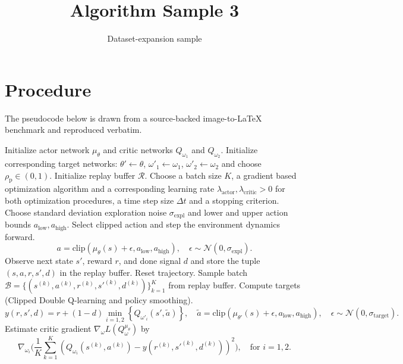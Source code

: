 \documentclass[11pt]{article}
\title{Algorithm Sample 3}
\author{Dataset-expansion sample}
\date{}
\begin{document}
\maketitle
\section{Procedure}
The pseudocode below is drawn from a source-backed image-to-LaTeX benchmark and reproduced verbatim.

\begin{algorithmic}
[1]
\State Initialize actor network $\mu_\theta$ and critic networks $Q_{\omega_1}$ and $Q_{\omega_2}$.
\State Initialize corresponding target networks: $\theta' \leftarrow \theta$, ${\omega'}_1 \leftarrow \omega_1$, ${\omega'}_2 \leftarrow \omega_2$ and choose $\rho_\text{p} \in (0, 1)$.
\State Initialize replay buffer $\mathcal{R}$.
\State Choose a batch size $K$, a gradient based optimization algorithm and a corresponding learning rate $\lambda_\text{actor}, \lambda_\text{critic} > 0$ for both optimization procedures, a time step size $\Delta t$ and a stopping criterion.
\State Choose standard deviation exploration noise $\sigma_\text{expl}$ and lower and upper action bounds $a_\text{low}, a_\text{high}$.
\Repeat
\State Select clipped action and step the environment dynamics forward.
\begin{equation*}
a= \text{clip}(\mu_\theta(s) + \epsilon, a_\text{low}, a_\text{high}), \quad \epsilon \sim \mathcal{N}(0, \sigma_\text{expl}).
\end{equation*}
\State Observe next state $s'$, reward $r$, and done signal $d$ and store the tuple $(s, a, r, s', d)$ in the replay buffer.
\State Reset trajectory.
\EndIf
{}
\State Sample batch $\mathcal{B} = \{(s^{(k)}, a^{(k)}, r^{(k)}, {s'}^{(k)}, d^{(k)})\}_{k=1}^K$ from replay buffer.
\State Compute targets (Clipped Double Q-learning and policy smoothing).
\begin{equation*}
y(r, s', d) = r + (1-d) \min\limits_{i=1, 2} \left\{ Q_{{\omega'}_i}(s', \tilde{a}) \right\}, \quad \tilde{a}= \text{clip}(\mu_{\theta'}(s) + \epsilon, a_\text{low}, a_\text{high}), \quad \epsilon \sim \mathcal{N}(0, \sigma_\text{target}).
\end{equation*}
\State Estimate critic gradient $\nabla_\omega L(Q_\omega^{\mu_\theta})$ by
\begin{equation*}
\nabla_{\omega_i} \Biggl(\frac{1}{K} \sum\limits_{k=1}^K \left(Q_{\omega_i}(s^{(k)}, a^{(k)}) - y(r^{(k)}, {s'}^{(k)}, d^{(k)}) \right)^2 \Biggr), \quad \text{for} \,\, i=1,2.

\end{equation*}
\end{algorithmic}
\end{document}
